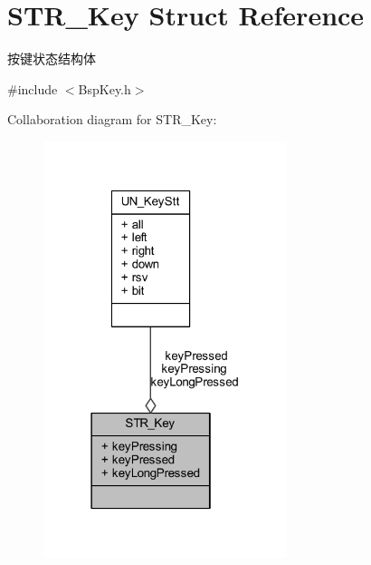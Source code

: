\hypertarget{struct_s_t_r___key}{\section{\-S\-T\-R\-\_\-\-Key \-Struct \-Reference}
\label{struct_s_t_r___key}
}


按键状态结构体  




{\ttfamily \#include $<$\-Bsp\-Key.\-h$>$}



\-Collaboration diagram for \-S\-T\-R\-\_\-\-Key\-:\nopagebreak
\begin{figure}[H]
\begin{center}
\leavevmode
\includegraphics[width=202pt]{struct_s_t_r___key__coll__graph}
\end{center}
\end{figure}
